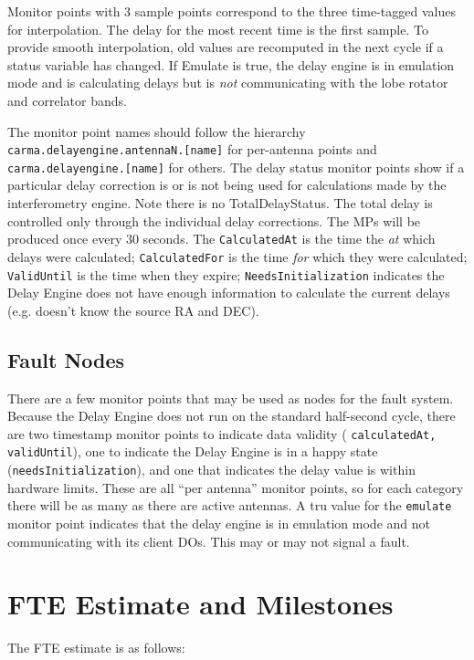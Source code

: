 \documentclass[preprint]{aastex}
\begin{document}
\noindent Monitor points with 3 sample points correspond to the three
time-tagged values for interpolation.  The delay for the most recent
time is the first sample. To provide smooth interpolation, old
values are recomputed in the next cycle if a status variable has changed.
If Emulate is true, the delay engine is in emulation mode and is calculating
delays but is {\em not} communicating with the lobe rotator and correlator
bands.  

The monitor point names should follow the hierarchy
{\tt carma.delayengine.antennaN.[name]} for per-antenna points
and {\tt carma.delayengine.[name]} for others.
The delay status monitor points show if a particular delay
correction is or is not being used for calculations made by the
interferometry engine. Note there is no TotalDelayStatus. The
total delay is controlled only through the individual delay
corrections.  The MPs will be produced once every 30 seconds.
The {\tt CalculatedAt} is the time the {\em at} which delays were
calculated; {\tt CalculatedFor} is the time {\em for} which they
were calculated; {\tt ValidUntil} is the time when they expire; 
{\tt NeedsInitialization} indicates the Delay Engine does not have
enough information to calculate the current delays (e.g. doesn't know the
source RA and DEC).

\subsection{Fault Nodes}
There are a few monitor points that may be used as nodes for the fault
system.  Because the Delay Engine does not run on the standard half-second
cycle, there are two timestamp monitor points to indicate data validity
( {\tt calculatedAt, validUntil}), one to indicate the Delay Engine is
in a happy state ({\tt needsInitialization}), and one that indicates the
delay value is within hardware limits.  These are all ``per antenna''
monitor points, so for each category there will be as many as there are
active antennas.  A tru value for the {\tt emulate} monitor point indicates
that the delay engine is in emulation mode and not communicating with
its client DOs.  This may or may not signal a fault.

\section{FTE Estimate and Milestones}
The FTE estimate is as follows:
\end{document}
